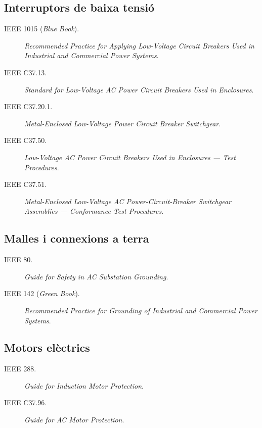 \subsection*{Interruptors de baixa tensió}
\begin{description}
	\item [\hspace{5mm}IEEE 1015 (\textit{Blue Book}).] \textit{Recommended Practice for Applying Low-Voltage Circuit Breakers Used in Industrial and Commercial Power Systems}. 
	\item [\hspace{5mm}IEEE C37.13.] \textit{Standard for Low-Voltage AC Power Circuit Breakers Used in Enclosures}. 
	\item [\hspace{5mm}IEEE C37.20.1.] \textit{Metal-Enclosed Low-Voltage Power Circuit Breaker Switchgear}.
	\item [\hspace{5mm}IEEE C37.50.] \textit{Low-Voltage AC Power Circuit Breakers Used in Enclosures --- Test Procedures}.
	\item [\hspace{5mm}IEEE C37.51.] \textit{Metal-Enclosed Low-Voltage AC Power-Circuit-Breaker Switchgear Assemblies --- Conformance Test Procedures}.
\end{description}


\subsection*{Malles i connexions a terra}
\begin{description}
	\item [\hspace{5mm}IEEE 80.] \textit{Guide for Safety in AC Substation Grounding}.
	\item [\hspace{5mm}IEEE 142 (\textit{Green Book}).] \textit{Recommended Practice for Grounding of Industrial and Commercial Power Systems}.
\end{description}

\subsection*{Motors elèctrics}
\begin{description}
	\item [\hspace{5mm}IEEE 288.] \textit{Guide for Induction Motor Protection}.
	\item [\hspace{5mm}IEEE C37.96.] \textit{Guide for AC Motor Protection}.
\end{description}


